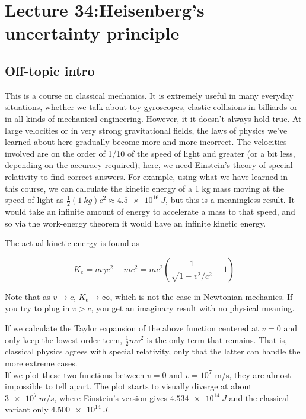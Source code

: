\documentclass[8.01x]{subfiles}
\begin{document}
\section{Lecture 34:Heisenberg's uncertainty principle}

\subsection{Off-topic intro}

This is a course on classical mechanics. It is extremely useful in many everyday situations, whether we talk about toy gyroscopes, elastic collisions in billiards or in all kinds of mechanical engineering. However, it it doesn't always hold true. At large velocities or in very strong gravitational fields, the laws of physics we've learned about here gradually become more and more incorrect. The velocities involved are on the order of 1/10 of the speed of light and greater (or a bit less, depending on the accuracy required); here, we need Einstein's theory of special relativity to find correct answers. For example, using what we have learned in this course, we can calculate the kinetic energy of a 1 kg mass moving at the speed of light as $\frac{1}{2} (\SI{1}{kg}) c^2 \approx \SI{4.5e16}{J}$, but this is a meaningless result. It would take an infinite amount of energy to accelerate a mass to that speed, and so via the work-energy theorem it would have an infinite kinetic energy.

The actual kinetic energy is found as

\begin{equation}
K_e = m \gamma c^2 - m c^2 = m c^2 \left( \frac{1}{\sqrt{1 - v^2/c^2}} - 1 \right)
\end{equation}

Note that as $v \to c$, $K_e \to \infty$, which is not the case in Newtonian mechanics. If you try to plug in $v > c$, you get an imaginary result with no physical meaning.

If we calculate the Taylor expansion of the above function centered at $v = 0$ and only keep the lowest-order term, $\frac{1}{2} m v^2$ is the only term that remains. That is, classical physics agrees with special relativity, only that the latter can handle the more extreme cases.\\
If we plot these two functions between $v = 0$ and $v = 10^7$ m/s, they are almost impossible to tell apart. The plot starts to visually diverge at about $\SI{3e7}{m/s}$, where Einstein's version gives $\SI{4.534e14}{J}$ and the classical variant only $\SI{4.500e14}{J}$.
\end{document}

